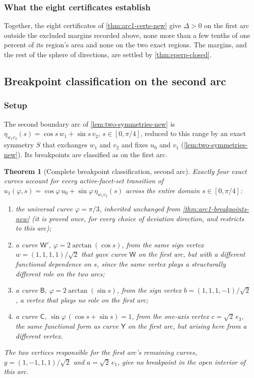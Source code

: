\documentclass[11pt,reqno]{amsart}
\renewcommand{\_}{\origunderscore\allowbreak}
\numberwithin{equation}{section}
\theoremstyle{plain}
\newtheorem{thm}{Theorem}[section]
\theoremstyle{definition}
\theoremstyle{remark}
\newcommand{\tilt}{\varphi}                  %
\newcommand{\arcp}{s}                        %
\newcommand{\dev}{\eta}                      %
\newcommand{\defect}{\Delta}                 %
\begin{document}
\subsubsection{What the eight certificates establish}

Together, the eight certificates of \cref{thm:arc1-certs-new} give
$\defect>0$ on the first arc outside the excluded margins recorded
above, none more than a few tenths of one percent of its region's area
and none on the two exact regions. The margins, and the rest of the
sphere of directions, are settled by \cref{thm:eperp-closed}.

\subsection{Breakpoint classification on the second arc}\label{sec:arc2-breakpoints}

\subsubsection{Setup}

The second boundary arc of \cref{lem:two-symmetries-new} is
$\dev_{w_1v_2}(\arcp)=\cos\arcp\,w_1+\sin\arcp\,v_2$,
$\arcp\in[0,\pi/4]$, reduced to this range by an exact symmetry $S$
that exchanges $w_1$ and $v_2$ and fixes $u_0$ and $v_1$
(\cref{lem:two-symmetries-new}). Its breakpoints are classified as on
the first arc.

\begin{thm}[Complete breakpoint classification, second arc]\label{thm:arc2-breakpoints-new}
Exactly four exact curves account for every active-facet-set transition
of $u_1(\tilt,\arcp)=\cos\tilt\,u_0+\sin\tilt\,\dev_{w_1v_2}(\arcp)$
across the entire domain $\arcp\in[0,\pi/4]$:
\begin{enumerate}[leftmargin=2em]
\item the universal curve $\tilt=\pi/3$, inherited unchanged from
\cref{thm:arc1-breakpoints-new} (it is proved once, for every choice of
deviation direction, and restricts to this arc);
\item a curve $\mathsf W'$, $\tilt=2\arctan(\cos\arcp)$, from the same
sign vertex $w=(1,1,1,1)/\sqrt2$ that gave curve $\mathsf W$ on the
first arc, but with a \emph{different} functional dependence on
$\arcp$, since the same vertex plays a structurally different role on
the two arcs;
\item a curve $\mathsf B$,
$\tilt=2\arctan(\sin\arcp)$, from the sign vertex
$b=(1,1,1,-1)/\sqrt2$, a vertex that plays no role on the first
arc;
\item a curve $\mathsf C$,
$\sin\tilt\,(\cos\arcp+\sin\arcp)=1$, from the one-axis vertex
$c=\sqrt2\,e_3$, the same functional form as curve $\mathsf Y$ on the
first arc, but arising here from a different vertex.
\end{enumerate}
The two vertices responsible for the first arc's remaining curves,
$y=(1,-1,1,1)/\sqrt2$ and $a=\sqrt2\,e_1$, give no breakpoint in the
open interior of this arc.
\end{thm}
\end{document}
